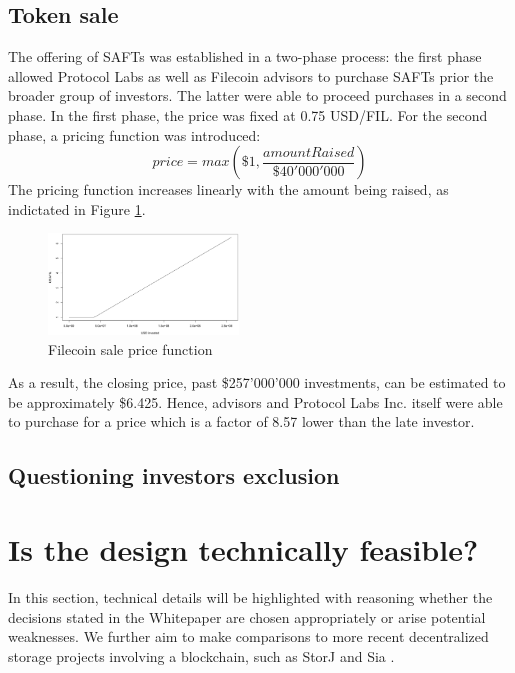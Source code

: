 \documentclass[journal]{IEEEtran}
\begin{document}
\subsection{Token sale}
\label{subsec:token-sale}
The offering of SAFTs was established in a two-phase process: the first phase allowed Protocol Labs as well as Filecoin advisors to purchase SAFTs prior the broader group of investors. 
The latter were able to proceed purchases in a second phase.
In the first phase, the price was fixed at 0.75 USD/FIL.
For the second phase, a pricing function was introduced:
\[ price = max(\$1, \frac{amountRaised}{\$40'000'000}) \]
The pricing function increases linearly with the amount being raised, as indictated in Figure \ref{fig:sale-price}.
\begin{figure}[h]
\centering
\includegraphics[width=0.45\textwidth]{filecoin-tokensale.png}
\caption{Filecoin sale price function}
\label{fig:sale-price}
\end{figure}
As a result, the closing price, past \$257'000'000 investments, can be estimated to be approximately \$6.425.
Hence, advisors and Protocol Labs Inc. itself were able to purchase for a price which is a factor of 8.57 lower than the late investor.

\subsection{Questioning investors exclusion}


\section{Is the design technically feasible?}

In this section, technical details will be highlighted with reasoning whether the decisions stated in the Whitepaper\cite{filecoin} are chosen appropriately or arise potential weaknesses.
We further aim to make comparisons to more recent decentralized storage projects involving a blockchain, such as StorJ \cite{storj} and Sia \cite{sia}.
\end{document}

